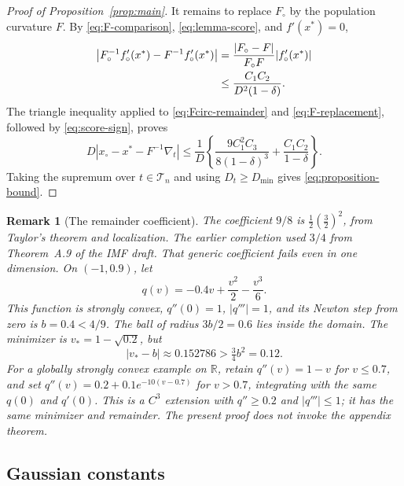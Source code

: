 \documentclass[11pt]{article}
\newcommand{\R}{\mathbb{R}}
\newcommand{\IF}{F}
\newcommand{\IFP}{F_{\circ}}
\newcommand{\DFN}{D}
\newcommand{\fs}{f}
\newcommand{\fp}{f_{\circ}}
\newcommand{\xs}{x^{*}}
\newcommand{\xp}{x_{\circ}}
\newtheorem*{remark}{Remark}
\begin{document}
\begin{proof}[Proof of Proposition~\ref{prop:main}]
It remains to replace \(\IFP\) by the population curvature \(\IF\).  By
\eqref{eq:F-comparison}, \eqref{eq:lemma-score}, and
\(\fs'(\xs)=0\),
\begin{align}
  \left|\IFP^{-1}\fp'(\xs)-\IF^{-1}\fp'(\xs)\right|
  &=\frac{|\IFP-\IF|}{\IFP\IF}|\fp'(\xs)|
  \notag\\
  &\leq\frac{C_1C_2}{\DFN^2(1-\delta)}.
  \label{eq:F-replacement}
\end{align}
The triangle inequality applied to \eqref{eq:Fcirc-remainder} and
\eqref{eq:F-replacement}, followed by \eqref{eq:score-sign}, proves
\begin{equation}
  \DFN\left|
    \xp-\xs-\IF^{-1}\nabla_t
  \right|
  \leq
  \frac{1}{\DFN}
  \left\{
    \frac{9C_1^2C_3}{8(1-\delta)^3}
    +\frac{C_1C_2}{1-\delta}
  \right\}.
  \label{eq:pointwise-final}
\end{equation}
Taking the supremum over \(t\in\mathcal T_n\) and using
\(\DFN_t\geq\DFN_{\min}\) gives \eqref{eq:proposition-bound}.
\end{proof}

\begin{remark}[The remainder coefficient]
The coefficient \(9/8\) is \(\tfrac12(\tfrac32)^2\), from Taylor's theorem
and localization.  The earlier completion used \(3/4\) from Theorem~A.9 of
the IMF draft.  That generic coefficient fails even in one dimension.  On
\((-1,0.9)\), let
\[
  q(v)=-0.4v+\frac{v^2}{2}-\frac{v^3}{6}.
\]
This function is strongly convex, \(q''(0)=1\), \(|q'''|=1\), and its Newton
step from zero is \(b=0.4<4/9\).  The ball of radius \(3b/2=0.6\) lies inside
the domain.  The minimizer is \(v_*=1-\sqrt{0.2}\), but
\[
  |v_*-b|\approx0.152786>\tfrac34 b^2=0.12.
\]
For a globally strongly convex example on \(\R\), retain \(q''(v)=1-v\) for
\(v\leq0.7\), and set
\(q''(v)=0.2+0.1e^{-10(v-0.7)}\) for \(v>0.7\), integrating with the same
\(q(0)\) and \(q'(0)\).  This is a \(C^3\) extension with \(q''\geq0.2\)
and \(|q'''|\leq1\); it has the same minimizer and remainder.  The present
proof does not invoke the appendix theorem.
\end{remark}

\subsection{Gaussian constants}
\end{document}
